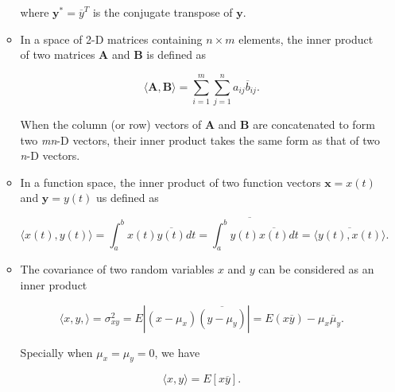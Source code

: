 \documentclass[10pt,b5paper,titlepage]{book}
\begin{document}
\begin{itemize}
\begin{itemize}
                where $\mathbf{y}^{*} = \overline{y}^{T}$ is the conjugate transpose
                of $\mathbf{y}$.

            \item In a space of 2-D matrices containing $n \times m$ elements,
                the inner product of two matrices $\mathbf{A}$
                and $\mathbf{B}$ is defined as

                \begin{equation}
                    \langle \mathbf{A}, \mathbf{B} \rangle
                    = \sum_{i=1}^{m} \sum_{j=1}^{n} a_{ij} \overline{b}_{ij}
                .\end{equation}

                When the column (or row) vectors of $\mathbf{A}$
                and $\mathbf{B}$ are concatenated to form two
                \textit{mn}-D vectors, their inner product takes the
                same form as that of two \textit{n}-D vectors.

            \item In a function space, the inner product of two function vectors
                $\mathbf{x} = x(t)$ and $\mathbf{y} = y(t)$ us defined as

                \begin{equation}
                    \langle x(t), y(t) \rangle
                    = \int_{a}^{b} x(t) \overline{y(t)} dt
                    = \overline{\int_{a}^{b} y(t) \overline{x(t)}}dt
                    = \overline{\langle y(t), x(t) \rangle}
                .\end{equation}

            \item The covariance of two random variables $x$ and $y$ can
                be considered as an inner product

                \begin{equation}
                    \langle x, y, \rangle = \sigma_{xy}^{2}
                    = E \left| (x - \mu_{x}) \overline{(y - \mu_{y})} \right|
                    = E(x \overline{y}) - \mu_{x} \overline{\mu}_{y}
                .\end{equation}

                Specially when $\mu_x = \mu_y = 0$, we have

                \begin{equation}
                    \langle x, y \rangle = E [x \overline{y}]
                .\end{equation}
        \end{itemize}


\end{itemize}
\end{document}

